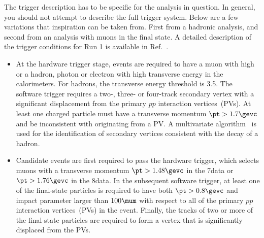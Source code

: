 The trigger description has to be specific for the analysis in
question. In general, you should not attempt to describe the full
trigger system. Below are a few variations that inspiration can be
taken from. First from a hadronic analysis, and second from an
analysis with muons in the final state.
A detailed description of the trigger conditions for Run 1 is available in Ref.~\cite{LHCb-PUB-2014-046}.
\begin{itemize}
\item At the hardware trigger stage, events are required to have a muon with high \pt or a
  hadron, photon or electron with high transverse energy in the calorimeters. For hadrons,
  the transverse energy threshold is 3.5\gev.
  The software trigger requires a two-, three- or four-track
  secondary vertex with a significant displacement from the primary
  $pp$ interaction vertices~(PVs). At least one charged particle
  must have a transverse momentum $\pt > 1.7\gevc$ and be
  inconsistent with originating from a PV.
  A multivariate algorithm~\cite{BBDT} is used for
  the identification of secondary vertices consistent with the decay
  of a \bquark hadron.
\item Candidate events are first required to pass the hardware trigger,
  which selects muons with a transverse momentum $\pt>1.48\gevc$ 
  in the 7\tev data or $\pt>1.76\gevc$ in the 8\tev data.
  In the subsequent software trigger, at least
  one of the final-state particles is required to have both
  $\pt>0.8\gevc$ and impact parameter larger than $100\mum$ with respect to all
  of the primary $pp$ interaction vertices~(PVs) in the
  event. Finally, the tracks of two or more of the final-state
  particles are required to form a vertex that is significantly
  displaced from the PVs.
\end{itemize}

